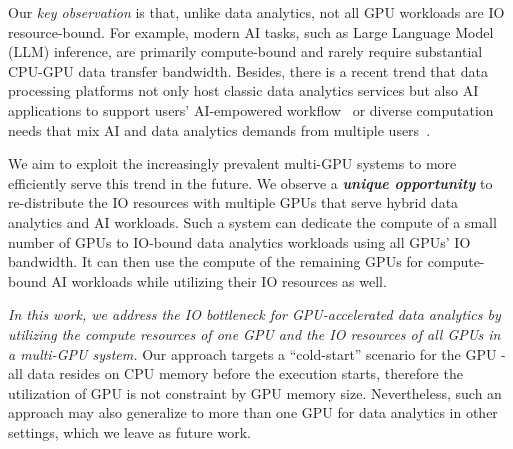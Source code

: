 
Our \textit{key observation} is that, unlike data analytics, not all GPU workloads are IO resource-bound. 
For example, modern AI tasks, such as Large Language Model (LLM) inference, are primarily compute-bound and rarely require substantial CPU-GPU data transfer bandwidth. 
Besides, there is a recent trend that data processing platforms not only host classic data analytics services but also AI applications to support users' AI-empowered workflow~\cite{biswal2024text2sqlenoughunifyingai, fan2024surveyragmeetingllms, golatkar2024cprretrievalaugmentedgeneration,xu2023seadendtoendtexttosqlgeneration, hui2021improvingtexttosqlschemadependency} or diverse computation needs that mix AI and data analytics demands from multiple users~\cite{chase-ai, fargo-llm-assitant}.

We aim to exploit the increasingly prevalent multi-GPU systems to more efficiently serve this trend in the future.
We observe a \textbf{\textit{unique opportunity}} to re-distribute the IO resources with multiple GPUs that serve hybrid data analytics and AI workloads. 
Such a system can dedicate the compute of a small number of GPUs to IO-bound data analytics workloads using all GPUs' IO bandwidth. 
It can then use the compute of the remaining GPUs for compute-bound AI workloads while utilizing their IO resources as well.

\textit{In this work, we address the IO bottleneck for GPU-accelerated data analytics by utilizing the compute resources of one GPU and the IO resources of all GPUs in a multi-GPU system.} 
Our approach targets a ``cold-start'' scenario for the GPU - all data resides on CPU memory before the execution starts, therefore the utilization of GPU is not constraint by GPU memory size.
Nevertheless, such an approach may also generalize to more than one GPU for data analytics in other settings, which we leave as future work.

